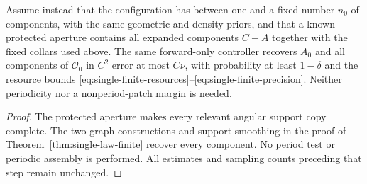 \begin{corollary}
\label{cor:single-finite-cloud}
Assume instead that the configuration has between one and a fixed
number $n_0$ of components, with the same geometric and density
priors, and that a known protected aperture contains all expanded
components $C-A$ together with the fixed collars used above.  The
same forward-only controller recovers $A_0$ and all components of
$\mathcal O_0$ in $C^2$ error at most $C\nu$, with probability at
least $1-\delta$ and the resource bounds
\eqref{eq:single-finite-resources}--\eqref{eq:single-finite-precision}.
Neither periodicity nor a nonperiod-patch margin is needed.
\end{corollary}
\begin{proof}
The protected aperture makes every relevant angular support copy
complete.  The two graph constructions and support smoothing in the
proof of Theorem~\ref{thm:single-law-finite} recover every component.
No period test or periodic assembly is performed.  All estimates and
sampling counts preceding that step remain unchanged.
\end{proof}
